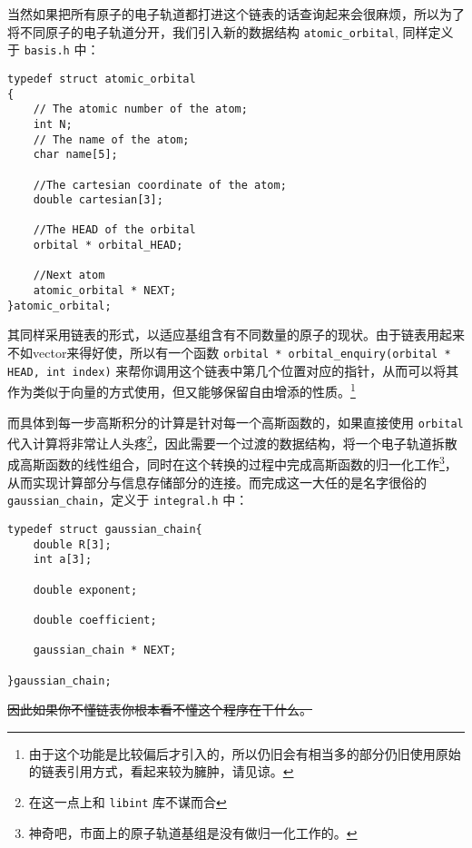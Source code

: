 \documentclass[12pt,a4paper,openany,twoside]{article}
\numberwithin{equation}{section}
\begin{document}
        当然如果把所有原子的电子轨道都打进这个链表的话查询起来会很麻烦，所以为了将不同原子的电子轨道分开，我们引入新的数据结构 \lstinline$atomic_orbital$, 同样定义于 \lstinline$basis.h$ 中：
        \begin{lstlisting}
typedef struct atomic_orbital
{
    // The atomic number of the atom;
    int N;
    // The name of the atom;
    char name[5];

    //The cartesian coordinate of the atom;
    double cartesian[3];

    //The HEAD of the orbital
    orbital * orbital_HEAD;

    //Next atom
    atomic_orbital * NEXT;
}atomic_orbital;
        \end{lstlisting}
        其同样采用链表的形式，以适应基组含有不同数量的原子的现状。由于链表用起来不如vector来得好使，所以有一个函数 \lstinline$orbital * orbital_enquiry(orbital * HEAD, int index)$ 来帮你调用这个链表中第几个位置对应的指针，从而可以将其作为类似于向量的方式使用，但又能够保留自由增添的性质。\footnote{由于这个功能是比较偏后才引入的，所以仍旧会有相当多的部分仍旧使用原始的链表引用方式，看起来较为臃肿，请见谅。}

        而具体到每一步高斯积分的计算是针对每一个高斯函数的，如果直接使用 \lstinline$orbital$ 代入计算将非常让人头疼\footnote{在这一点上和 \lstinline$libint$ 库不谋而合}，因此需要一个过渡的数据结构，将一个电子轨道拆散成高斯函数的线性组合，同时在这个转换的过程中完成高斯函数的归一化工作\footnote{神奇吧，市面上的原子轨道基组是没有做归一化工作的。}，从而实现计算部分与信息存储部分的连接。而完成这一大任的是名字很俗的 \lstinline$gaussian_chain$，定义于 \lstinline$integral.h$ 中：
        \begin{lstlisting}
typedef struct gaussian_chain{
    double R[3];
    int a[3];
    
    double exponent;

    double coefficient;

    gaussian_chain * NEXT;

}gaussian_chain;
        \end{lstlisting}
        \sout{因此如果你不懂链表你根本看不懂这个程序在干什么。}
\end{document}
